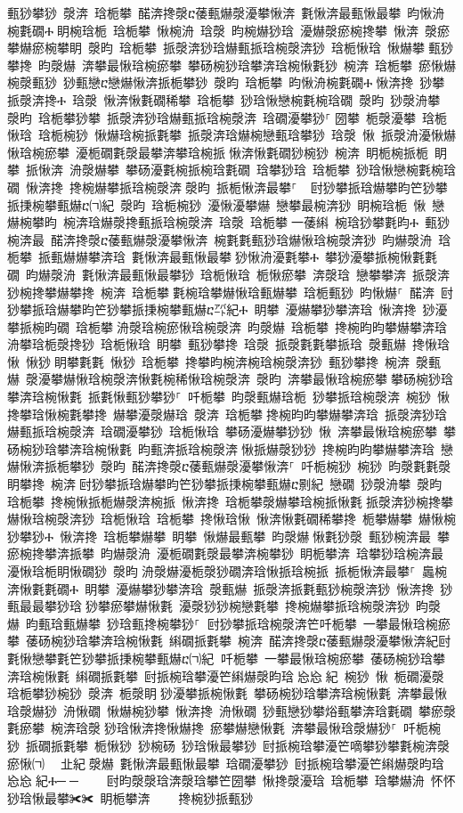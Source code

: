 ﻿\documentclass[output=paper]{langsci/langscibook}
\begin{document}
甀猀攀猀 漀渀 琀栀攀 䤀渀搀漀ⴀ䔀甀爀漀瀀攀愀渀 氀愀渀最甀愀最攀 昀愀洀椀氀礀Ⰰ਀眀椀琀栀 琀栀攀 愀椀洀 琀漀 昀椀爀猀琀 瀀爀漀瘀椀搀攀 愀渀 漀瘀攀爀瘀椀攀眀 漀昀 琀栀攀 挀漀渀猀琀爀甀挀琀椀漀渀猀 琀栀愀琀 愀爀攀਀甀猀攀搀 昀漀爀 渀攀最愀琀椀瘀攀 攀砀椀猀琀攀渀琀椀愀氀猀 椀渀 琀栀攀 瘀愀爀椀漀甀猀 猀甀戀ⴀ戀爀愀渀挀栀攀猀 漀昀 琀栀攀 昀愀洀椀氀礀Ⰰ਀愀渀搀 猀攀挀漀渀搀Ⰰ 琀漀 愀渀愀氀礀稀攀 琀栀攀 猀琀愀戀椀氀椀琀礀 漀昀 猀漀洀攀 漀昀 琀栀攀猀攀 挀漀渀猀琀爀甀挀琀椀漀渀 琀礀瀀攀猀⸀਀圀攀 栀漀瀀攀 琀栀愀琀 琀栀椀猀 愀爀琀椀挀氀攀 挀漀渀琀爀椀戀甀琀攀猀 琀漀 愀 挀漀洀瀀愀爀愀琀椀瘀攀 瀀栀礀氀漀最攀渀攀琀椀挀਀愀渀愀氀礀猀椀猀 椀渀 眀栀椀挀栀 眀攀 挀愀渀 洀漀爀攀 攀砀瀀氀椀挀椀琀氀礀 琀攀猀琀 琀栀攀 猀琀愀戀椀氀椀琀礀 愀渀搀 搀椀爀攀挀琀椀漀渀਀漀昀 挀栀愀渀最攀⸀ ਀਀尀猀攀挀琀爀攀昀笀猀攀挀㨀椀攀甀爀ⴀ㈀紀 漀昀 琀栀椀猀 瀀愀瀀攀爀 戀攀最椀渀猀 眀椀琀栀 愀 戀爀椀攀昀 椀渀琀爀漀搀甀挀琀椀漀渀 琀漀 琀栀攀਀一䔀䌀 椀琀猀攀氀昀Ⰰ 甀猀椀渀最 䤀渀搀漀ⴀ䔀甀爀漀瀀攀愀渀 椀氀氀甀猀琀爀愀琀椀漀渀猀 昀爀漀洀 琀栀攀 挀甀爀爀攀渀琀 氀愀渀最甀愀最攀਀猀愀洀瀀氀攀Ⰰ 攀猀瀀攀挀椀愀氀氀礀 昀爀漀洀 氀愀渀最甀愀最攀猀 琀栀愀琀 栀愀瘀攀 渀漀琀 戀攀攀渀 挀漀渀猀椀搀攀爀攀搀 椀渀 琀栀攀਀氀椀琀攀爀愀琀甀爀攀 琀栀甀猀 昀愀爀⸀ 䤀渀 尀猀攀挀琀爀攀昀笀猀攀挀㨀椀攀甀爀ⴀ㌀紀Ⰰ 眀攀 瀀爀攀猀攀渀琀 愀渀搀 猀瀀攀挀椀昀礀 琀栀攀਀洀漀琀椀瘀愀琀椀漀渀 昀漀爀 琀栀攀 搀椀昀昀攀爀攀渀琀 洀攀琀栀漀搀猀 琀栀愀琀 眀攀 甀猀攀搀 琀漀 挀漀氀氀攀挀琀 漀甀爀 搀愀琀愀 愀猀਀眀攀氀氀 愀猀 琀栀攀 搀攀昀椀渀椀琀椀漀渀猀 甀猀攀搀 椀渀 漀甀爀 漀瀀攀爀愀琀椀漀渀愀氀椀稀愀琀椀漀渀 漀昀 渀攀最愀琀椀瘀攀਀攀砀椀猀琀攀渀琀椀愀氀 挀氀愀甀猀攀猀⸀ 吀栀攀 昀漀甀爀琀栀 猀攀挀琀椀漀渀 椀猀 愀 搀攀琀愀椀氀攀搀 爀攀瀀漀爀琀 漀渀 琀栀攀਀搀椀昀昀攀爀攀渀琀 挀漀渀猀琀爀甀挀琀椀漀渀 琀礀瀀攀猀 琀栀愀琀 攀砀瀀爀攀猀猀 愀 渀攀最愀琀椀瘀攀 攀砀椀猀琀攀渀琀椀愀氀 昀甀渀挀琀椀漀渀਀愀挀爀漀猀猀 搀椀昀昀攀爀攀渀琀 戀爀愀渀挀栀攀猀 漀昀 䤀渀搀漀ⴀ䔀甀爀漀瀀攀愀渀⸀ 吀栀椀猀 椀猀 昀漀氀氀漀眀攀搀 椀渀਀尀猀攀挀琀爀攀昀笀猀攀挀㨀椀攀甀爀ⴀ㔀紀 戀礀 猀漀洀攀 漀昀 琀栀攀 搀椀愀挀栀爀漀渀椀挀 愀渀搀 琀栀攀漀爀攀琀椀挀愀氀਀挀漀渀猀椀搀攀爀愀琀椀漀渀猀 琀栀愀琀 琀栀攀 搀愀琀愀 愀渀愀氀礀稀攀搀 栀攀爀攀 爀愀椀猀攀猀Ⰰ 愀渀搀 琀栀攀爀攀 眀攀 愀爀最甀攀 昀漀爀਀愀氀猀漀 甀猀椀渀最 攀瘀椀搀攀渀挀攀 昀爀漀洀 瀀栀礀氀漀最攀渀椀攀猀 眀栀攀渀 琀攀猀琀椀渀最 瀀愀琀栀眀愀礀猀 漀昀਀洀漀爀瀀栀漀猀礀渀琀愀挀琀椀挀 挀栀愀渀最攀⸀ 䘀椀渀愀氀氀礀Ⰰ 眀攀 瀀爀攀猀攀渀琀 漀甀爀 挀漀渀挀氀甀猀椀漀渀猀 愀渀搀 猀甀最最攀猀琀਀猀攀瘀攀爀愀氀 瀀漀猀猀椀戀氀攀 搀椀爀攀挀琀椀漀渀猀 昀漀爀 昀甀琀甀爀攀 猀琀甀搀椀攀猀⸀਀਀尀猀攀挀琀椀漀渀笀吀栀攀 一攀最愀琀椀瘀攀 䔀砀椀猀琀攀渀琀椀愀氀 䌀礀挀氀攀 椀渀 䤀渀搀漀ⴀ䔀甀爀漀瀀攀愀渀紀尀氀愀戀攀氀笀猀攀挀㨀椀攀甀爀ⴀ㈀紀਀਀吀栀攀 一攀最愀琀椀瘀攀 䔀砀椀猀琀攀渀琀椀愀氀 䌀礀挀氀攀 尀挀椀琀攀瀀笀䌀爀漀昀琀㄀㤀㤀㄀紀 椀猀 愀 栀礀瀀漀琀栀攀猀椀猀 漀渀 栀漀眀਀猀瀀攀挀椀愀氀 攀砀椀猀琀攀渀琀椀愀氀 渀攀最愀琀漀爀猀 洀愀礀 愀爀椀猀攀 愀渀搀 洀愀礀 猀甀戀猀攀焀甀攀渀琀氀礀 攀瘀漀氀瘀攀 椀渀琀漀਀猀琀愀渀搀愀爀搀 瘀攀爀戀愀氀 渀攀最愀琀漀爀猀⸀ 吀栀椀猀 挀礀挀氀攀 栀愀猀 猀椀砀 猀琀愀最攀猀 尀挀椀琀攀瀀笀嘀攀猀攀氀椀渀漀瘀愀㈀　㄀㐀紀਀漀爀 氀愀渀最甀愀最攀 琀礀瀀攀猀 尀挀椀琀攀瀀笀䌀爀漀昀琀㄀㤀㤀㄀紀Ⰰ─਀─਀    尀昀漀漀琀渀漀琀攀笀圀攀 愀搀漀瀀琀 琀栀攀 琀攀爀洀 怀怀猀琀愀最攀✀✀ 眀栀攀渀਀    搀椀猀挀甀猀
\end{document}
